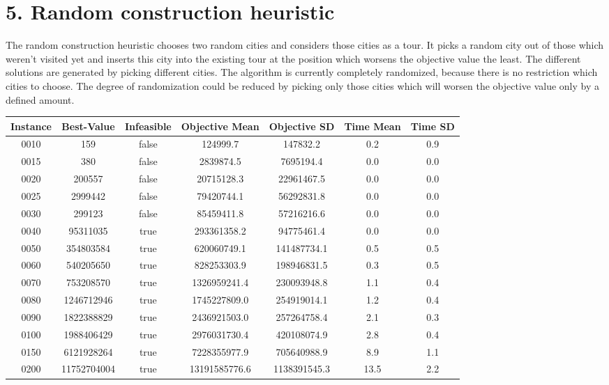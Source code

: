 \section*{5. Random construction heuristic}
The random construction heuristic chooses two random cities and considers those cities as a tour. It picks a random city out of those which weren't visited yet and inserts this city into the existing tour at the position which worsens the objective value the least. The different solutions are generated by picking different cities. The algorithm is currently completely randomized, because there is no restriction which cities to choose. The degree of randomization could be reduced by picking only those cities which will worsen the objective value only by a defined amount.

\begin{center}
	\begin{tabular}{|| c | c | c | c | c | c | c ||} 
		\hline
		Instance & Best-Value & Infeasible & Objective Mean & Objective SD & Time Mean & Time SD  \\
		\hline\hline
0010 & 159 & false & 124999.7 & 147832.2 & 0.2 & 0.9 \\
0015 & 380 & false & 2839874.5 & 7695194.4 & 0.0 & 0.0 \\
0020 & 200557 & false & 20715128.3 & 22961467.5 & 0.0 & 0.0 \\
0025 & 2999442 & false & 79420744.1 & 56292831.8 & 0.0 & 0.0 \\
0030 & 299123 & false & 85459411.8 & 57216216.6 & 0.0 & 0.0 \\
0040 & 95311035 & true & 293361358.2 & 94775461.4 & 0.0 & 0.0 \\
0050 & 354803584 & true & 620060749.1 & 141487734.1 & 0.5 & 0.5 \\
0060 & 540205650 & true & 828253303.9 & 198946831.5 & 0.3 & 0.5 \\
0070 & 753208570 & true & 1326959241.4 & 230093948.8 & 1.1 & 0.4 \\
0080 & 1246712946 & true & 1745227809.0 & 254919014.1 & 1.2 & 0.4 \\
0090 & 1822388829 & true & 2436921503.0 & 257264758.4 & 2.1 & 0.3 \\
0100 & 1988406429 & true & 2976031730.4 & 420108074.9 & 2.8 & 0.4 \\
0150 & 6121928264 & true & 7228355977.9 & 705640988.9 & 8.9 & 1.1 \\
0200 & 11752704004 & true & 13191585776.6 & 1138391545.3 & 13.5 & 2.2 \\

\end{tabular}
\end{center}
